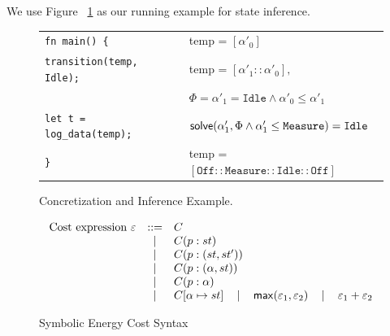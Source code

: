 \documentclass[sigconf, nonacm, screen]{acmart}
\begin{document}
We use Figure ~\ref{fig:concretization-and-inference} as our running example for state inference. 

\begin{figure}[h]
  \centering
  \small
  \begin{tabular}{ll}
    \texttt{fn main() \{} & temp = $[\alpha'_0]$\\
    \texttt{\quad transition(temp, Idle);} & temp = $[\alpha'_1 :: \alpha'_0],$ \\ \text{} & $\Phi = \alpha'_1 = \texttt{Idle} \land \alpha'_0 \leq \alpha'_1$ \\
    \texttt{\quad let t = log\_data(temp);} & $\mathsf{solve}(\alpha'_1, \Phi \land \alpha'_1 \leq \texttt{Measure}) = \texttt{Idle}$ \\
    \texttt{\}} & temp = $[\texttt{Off} :: \texttt{Measure}  :: \texttt{Idle}:: \texttt{Off}]$\\
  \end{tabular}
  \vspace{-6pt}
  \caption{Concretization and Inference Example.}
  \label{fig:concretization-and-inference}
\end{figure}

\begin{figure}
\small
    \centering
   \[
    \begin{array}{lcll}
     \text{Cost expression }\varepsilon & ::= & C \\ & \,|\, &  C(p : st)   \\ & \,|\, & C(p : (st, st'))   \\
     & \,|\, & C(p : (\alpha, st))   \\ & \,|\, & C(p : \alpha) \\ & \,|\, & C[\alpha \mapsto st] \quad \,|\, \quad \mathsf{max}(\varepsilon_1, \varepsilon_2) \quad \,|\, \quad \varepsilon_1 + \varepsilon_2 
\end{array}
   \]
   \vspace{-6pt}
   \caption{Symbolic Energy Cost Syntax}
   \label{fig: symolic_energy_syntax}
\end{figure}
\end{document}
